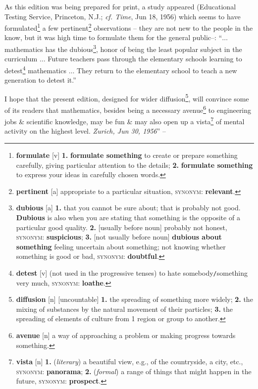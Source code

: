 \documentclass[oneside]{book}
\numberwithin{equation}{section}
\begin{document}
As this edition was being prepared for print, a study appeared (Educational Testing Service, Princeton, N.J.; \textit{cf. Time}, Jun 18, 1956) which seems to have formulated\footnote{\textbf{formulate} [v] \textbf{1.} \textbf{formulate something} to create or prepare something carefully, giving particular attention to the details; \textbf{2.} \textbf{formulate something} to express your ideas in carefully chosen words.} a few pertinent\footnote{\textbf{pertinent} [a] appropriate to a particular situation, \textsc{synonym}: \textbf{relevant}.} observations -- they are not new to the people in the know, but it was high time to formulate them for the general public--: ``$\ldots$ mathematics has the dubious\footnote{\textbf{dubious} [a] \textbf{1.} that you cannot be sure about; that is probably not good. \textbf{Dubious} is also when you are stating that something is the opposite of a particular good quality. \textbf{2.} [usually before noun] probably not honest, \textsc{synonym}: \textbf{suspicious}; \textbf{3.} [not usually before noun] \textbf{dubious about something} feeling uncertain about something; not knowing whether something is good or bad, \textsc{synonym}: \textbf{doubtful}.}, honor of being the least popular subject in the curriculum $\ldots$ Future teachers pass through the elementary schools learning to detest\footnote{\textbf{detest} [v] (not used in the progressive tenses) to hate somebody\texttt{/}something very much, \textsc{synonym}: \textbf{loathe}.} mathematics $\ldots$ They return to the elementary school to teach a new generation to detest it.''

I hope that the present edition, designed for wider diffusion\footnote{\textbf{diffusion} [n] [uncountable] \textbf{1.} the spreading of something more widely; \textbf{2.} the mixing of substances by the natural movement of their particles; \textbf{3.} the spreading of elements of culture from 1 region or group to another.}, will convince some of its readers that mathematics, besides being a necessary avenue\footnote{\textbf{avenue} [n] a way of approaching a problem or making progress towards something.} to engineering jobs \& scientific knowledge, may be fun \& may also open up a vista\footnote{\textbf{vista} [n] \textbf{1.} (\textit{literary}) a beautiful view, e.g., of the countryside, a city, etc., \textsc{synonym}: \textbf{panorama}; \textbf{2.} (\textit{formal}) a range of things that might happen in the future, \textsc{synonym}: \textbf{prospect}.} of mental activity on the highest level. \textit{Zurich, Jun 30, 1956}'' -- \cite[pp. ix--]{Polya2014}
\end{document}
